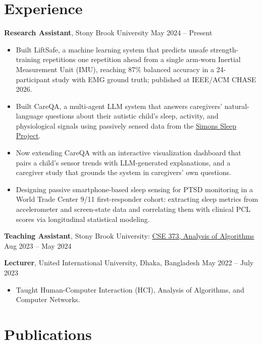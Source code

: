 \documentclass[10pt, letterpaper]{article}
\newenvironment{highlights}{
    \begin{itemize}[
        topsep=0.06 cm,
        parsep=0.04 cm,
        partopsep=0pt,
        itemsep=0pt,
        leftmargin=10pt
    ]
}{
    \end{itemize}
}
\newcommand{\entry}[2]{\par\noindent #1 \hfill #2\par}
\begin{document}
\section{Experience}

\entry{\textbf{Research Assistant}, Stony Brook University}{May 2024 -- Present}
\begin{highlights}
    \item Built LiftSafe, a machine learning system that predicts unsafe strength-training repetitions one repetition ahead from a single arm-worn Inertial Measurement Unit (IMU), reaching 87\% balanced accuracy in a 24-participant study with EMG ground truth; published at IEEE/ACM CHASE 2026.
    \item Built CareQA, a multi-agent LLM system that answers caregivers' natural-language questions about their autistic child's sleep, activity, and physiological signals using passively sensed data from the \href{https://www.sfari.org/resource/simons-sleep-project/}{\underline{Simons Sleep Project}}.
    \item Now extending CareQA with an interactive visualization dashboard that pairs a child's sensor trends with LLM-generated explanations, and a caregiver study that grounds the system in caregivers' own questions.
    \item Designing passive smartphone-based sleep sensing for PTSD monitoring in a World Trade Center 9/11 first-responder cohort: extracting sleep metrics from accelerometer and screen-state data and correlating them with clinical PCL scores via longitudinal statistical modeling.
\end{highlights}

\entry{\textbf{Teaching Assistant}, Stony Brook University: \href{https://www3.cs.stonybrook.edu/~skiena/373/}{\underline{CSE 373, Analysis of Algorithms}}}{Aug 2023 -- May 2024}

\entry{\textbf{Lecturer}, United International University, Dhaka, Bangladesh}{May 2022 -- July 2023}
\begin{highlights}
    \item Taught Human-Computer Interaction (HCI), Analysis of Algorithms, and Computer Networks.
\end{highlights}

\section{Publications}
\end{document}
